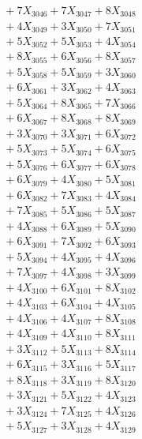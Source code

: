 \documentclass[a4paper,10pt]{article}
\begin{document}
{\begin{align}
&\;  + 7 X_{3046} + 7 X_{3047} + 8 X_{3048} \\[0.3ex]
&\;  + 4 X_{3049} + 3 X_{3050} + 7 X_{3051} \\[0.3ex]
&\;  + 5 X_{3052} + 5 X_{3053} + 4 X_{3054} \\[0.3ex]
&\;  + 8 X_{3055} + 6 X_{3056} + 8 X_{3057} \\[0.3ex]
&\;  + 5 X_{3058} + 5 X_{3059} + 3 X_{3060} \\[0.3ex]
&\;  + 6 X_{3061} + 3 X_{3062} + 4 X_{3063} \\[0.3ex]
&\;  + 5 X_{3064} + 8 X_{3065} + 7 X_{3066} \\[0.3ex]
&\;  + 6 X_{3067} + 8 X_{3068} + 8 X_{3069} \\[0.5ex]\allowbreak
&\;  + 3 X_{3070} + 3 X_{3071} + 6 X_{3072} \\[0.3ex]
&\;  + 5 X_{3073} + 5 X_{3074} + 6 X_{3075} \\[0.3ex]
&\;  + 5 X_{3076} + 6 X_{3077} + 6 X_{3078} \\[0.3ex]
&\;  + 6 X_{3079} + 4 X_{3080} + 5 X_{3081} \\[0.3ex]
&\;  + 6 X_{3082} + 7 X_{3083} + 4 X_{3084} \\[0.3ex]
&\;  + 7 X_{3085} + 5 X_{3086} + 5 X_{3087} \\[0.3ex]
&\;  + 4 X_{3088} + 6 X_{3089} + 5 X_{3090} \\[0.3ex]
&\;  + 6 X_{3091} + 7 X_{3092} + 6 X_{3093} \\[0.3ex]
&\;  + 5 X_{3094} + 4 X_{3095} + 4 X_{3096} \\[0.3ex]
&\;  + 7 X_{3097} + 4 X_{3098} + 3 X_{3099} \\[0.5ex]\allowbreak
&\;  + 4 X_{3100} + 6 X_{3101} + 8 X_{3102} \\[0.3ex]
&\;  + 4 X_{3103} + 6 X_{3104} + 4 X_{3105} \\[0.3ex]
&\;  + 4 X_{3106} + 4 X_{3107} + 8 X_{3108} \\[0.3ex]
&\;  + 4 X_{3109} + 4 X_{3110} + 8 X_{3111} \\[0.3ex]
&\;  + 3 X_{3112} + 5 X_{3113} + 8 X_{3114} \\[0.3ex]
&\;  + 6 X_{3115} + 3 X_{3116} + 5 X_{3117} \\[0.3ex]
&\;  + 8 X_{3118} + 3 X_{3119} + 8 X_{3120} \\[0.3ex]
&\;  + 3 X_{3121} + 5 X_{3122} + 4 X_{3123} \\[0.3ex]
&\;  + 3 X_{3124} + 7 X_{3125} + 4 X_{3126} \\[0.3ex]
&\;  + 5 X_{3127} + 3 X_{3128} + 4 X_{3129} \\[0.5ex]\allowbreak

\end{align}}
\end{document}
